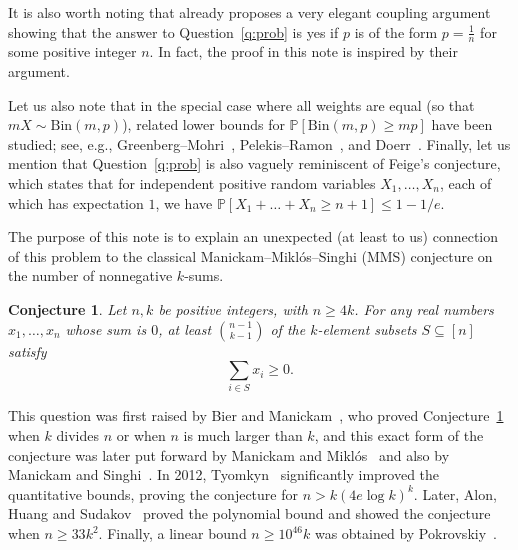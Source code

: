 \documentclass[11pt]{amsart}
\newtheorem{conjecture}[theorem]{\bf Conjecture}
\theoremstyle{definition}
\def\Pb{\mathbb{P}}
\begin{document}
It is also worth noting that \cite{AEFT13} already proposes a very elegant coupling argument showing that the answer to Question~\ref{q:prob} is yes if $p$ is of the form $p=\frac{1}{n}$ for some positive integer $n$. In fact, the proof in this note is inspired by their argument. %

Let us also note that in the special case where all weights are equal (so that $mX\sim \mathrm{Bin}(m,p)$), related lower bounds for $\Pb[\mathrm{Bin}(m,p)\ge mp]$ have been studied; see, e.g., Greenberg--Mohri~\cite{GM14}, Pelekis--Ramon~\cite{PR16}, and Doerr~\cite{Doe18}. Finally, let us mention that Question~\ref{q:prob} is also vaguely reminiscent of Feige's conjecture, which states that for independent positive random variables $X_1, \dots, X_n$, each of which has expectation $1$, we have $\Pb[X_1+\dots+X_n\geq n+1]\leq 1-1/e$. 

The purpose of this note is to explain an unexpected (at least to us) connection of this problem to the classical
Manickam--Mikl\'os--Singhi (MMS) conjecture on the number of nonnegative $k$-sums.

\begin{conjecture}\label{conj:MMS}
Let $n,k$ be positive integers, with $n\ge 4k$. For any real numbers $x_1,\dots,x_n$ whose sum is $0$, at least $\binom{n-1}{k-1}$ of the $k$-element subsets $S\subseteq [n]$ satisfy
\[
  \sum_{i\in S} x_i \ge 0.
\]
\end{conjecture}

This question was first raised by Bier and Manickam~\cite{BM87}, who proved Conjecture~\ref{conj:MMS} when $k$ divides $n$ or when $n$ is much larger than $k$, and this exact form of the conjecture was later put forward by Manickam and Mikl\'os~\cite{MM88} and also by Manickam and Singhi~\cite{MS88}. In 2012, Tyomkyn~\cite{Tyom12} significantly improved the quantitative bounds, proving the conjecture for $n>k(4e\log k)^k$. Later, Alon, Huang and Sudakov~\cite{AHS11} proved the polynomial bound and showed the conjecture when $n\ge 33k^2$. Finally, a linear bound $n\geq 10^{46} k$ was obtained by Pokrovskiy~\cite{Pok15}.

\end{document}

